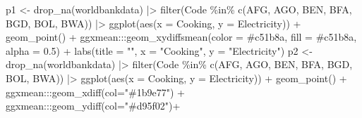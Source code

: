 \documentclass[
  letterpaper,
  DIV=11,
  numbers=noendperiod]{scrreprt}
\newenvironment{Shaded}{\begin{snugshade}}{\end{snugshade}}
\newcommand{\AttributeTok}[1]{\textcolor[rgb]{0.40,0.45,0.13}{#1}}
\newcommand{\FloatTok}[1]{\textcolor[rgb]{0.68,0.00,0.00}{#1}}
\newcommand{\FunctionTok}[1]{\textcolor[rgb]{0.28,0.35,0.67}{#1}}
\newcommand{\NormalTok}[1]{\textcolor[rgb]{0.00,0.23,0.31}{#1}}
\newcommand{\OtherTok}[1]{\textcolor[rgb]{0.00,0.23,0.31}{#1}}
\newcommand{\SpecialCharTok}[1]{\textcolor[rgb]{0.37,0.37,0.37}{#1}}
\newcommand{\StringTok}[1]{\textcolor[rgb]{0.13,0.47,0.30}{#1}}
\begin{document}
\begin{Shaded}
\begin{Highlighting}[]
\NormalTok{p1 }\OtherTok{\textless{}{-}} \FunctionTok{drop\_na}\NormalTok{(worldbankdata) }\SpecialCharTok{|\textgreater{}}
  \FunctionTok{filter}\NormalTok{(Code }\SpecialCharTok{\%in\%} \FunctionTok{c}\NormalTok{(}\StringTok{\textquotesingle{}AFG\textquotesingle{}}\NormalTok{, }\StringTok{\textquotesingle{}AGO\textquotesingle{}}\NormalTok{, }\StringTok{\textquotesingle{}BEN\textquotesingle{}}\NormalTok{, }\StringTok{\textquotesingle{}BFA\textquotesingle{}}\NormalTok{, }\StringTok{\textquotesingle{}BGD\textquotesingle{}}\NormalTok{, }\StringTok{\textquotesingle{}BOL\textquotesingle{}}\NormalTok{, }\StringTok{\textquotesingle{}BWA\textquotesingle{}}\NormalTok{)) }\SpecialCharTok{|\textgreater{}}
  \FunctionTok{ggplot}\NormalTok{(}\FunctionTok{aes}\NormalTok{(}\AttributeTok{x =}\NormalTok{ Cooking, }\AttributeTok{y =}\NormalTok{ Electricity)) }\SpecialCharTok{+} 
  \FunctionTok{geom\_point}\NormalTok{() }\SpecialCharTok{+}
\NormalTok{  ggxmean}\SpecialCharTok{:::}\FunctionTok{geom\_xydiffsmean}\NormalTok{(}\AttributeTok{color =} \StringTok{\textquotesingle{}\#c51b8a\textquotesingle{}}\NormalTok{, }\AttributeTok{fill =} \StringTok{\textquotesingle{}\#c51b8a\textquotesingle{}}\NormalTok{, }\AttributeTok{alpha =} \FloatTok{0.5}\NormalTok{) }\SpecialCharTok{+}
  \FunctionTok{labs}\NormalTok{(}\AttributeTok{title =} \StringTok{""}\NormalTok{, }\AttributeTok{x =} \StringTok{"Cooking"}\NormalTok{, }\AttributeTok{y =} \StringTok{"Electricity"}\NormalTok{) }
\NormalTok{p2 }\OtherTok{\textless{}{-}} \FunctionTok{drop\_na}\NormalTok{(worldbankdata) }\SpecialCharTok{|\textgreater{}}
  \FunctionTok{filter}\NormalTok{(Code }\SpecialCharTok{\%in\%} \FunctionTok{c}\NormalTok{(}\StringTok{\textquotesingle{}AFG\textquotesingle{}}\NormalTok{, }\StringTok{\textquotesingle{}AGO\textquotesingle{}}\NormalTok{, }\StringTok{\textquotesingle{}BEN\textquotesingle{}}\NormalTok{, }\StringTok{\textquotesingle{}BFA\textquotesingle{}}\NormalTok{, }\StringTok{\textquotesingle{}BGD\textquotesingle{}}\NormalTok{, }\StringTok{\textquotesingle{}BOL\textquotesingle{}}\NormalTok{, }\StringTok{\textquotesingle{}BWA\textquotesingle{}}\NormalTok{)) }\SpecialCharTok{|\textgreater{}}
  \FunctionTok{ggplot}\NormalTok{(}\FunctionTok{aes}\NormalTok{(}\AttributeTok{x =}\NormalTok{ Cooking, }\AttributeTok{y =}\NormalTok{ Electricity)) }\SpecialCharTok{+} 
  \FunctionTok{geom\_point}\NormalTok{() }\SpecialCharTok{+}\NormalTok{ ggxmean}\SpecialCharTok{:::}\FunctionTok{geom\_xdiff}\NormalTok{(}\AttributeTok{col=}\StringTok{"\#1b9e77"}\NormalTok{) }\SpecialCharTok{+}\NormalTok{ ggxmean}\SpecialCharTok{:::}\FunctionTok{geom\_ydiff}\NormalTok{(}\AttributeTok{col=}\StringTok{"\#d95f02"}\NormalTok{)}\SpecialCharTok{+}

\end{Highlighting}
\end{Shaded}
\end{document}
